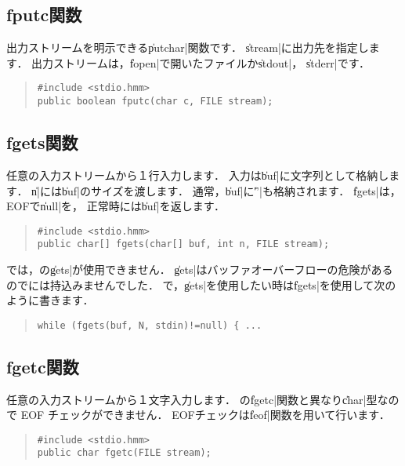\subsection{fputc関数}

出力ストリームを明示できる\|putchar|関数です．
\|stream|に出力先を指定します．
出力ストリームは，\|fopen|で開いたファイルか\|stdout|，
\|stderr|です．

\begin{quote}
\begin{verbatim}
#include <stdio.hmm>
public boolean fputc(char c, FILE stream);
\end{verbatim}
\end{quote}

\subsection{fgets関数}

任意の入力ストリームから１行入力します．
入力は\|buf|に文字列として格納します．
\|n|には\|buf|のサイズを渡します．
通常，\|buf|に\|'\n'|も格納されます．
\|fgets|は，EOFで\|null|を，
正常時には\|buf|を返します．

\begin{quote}
\begin{verbatim}
#include <stdio.hmm>
public char[] fgets(char[] buf, int n, FILE stream);
\end{verbatim}
\end{quote}

\cmm では，\cl の\|gets|が使用できません．
\|gets|はバッファオーバーフローの危険があるので\cmm には持込みませんでした．
\cmm で，\|gets|を使用したい時は\|fgets|を使用して次のように書きます．

\begin{quote}
\begin{verbatim}
while (fgets(buf, N, stdin)!=null) { ...
\end{verbatim}
\end{quote}


\subsection{fgetc関数}

任意の入力ストリームから１文字入力します．
\cl の\|fgetc|関数と異なり\|char|型なので EOF チェックができません．
EOFチェックは\|feof|関数を用いて行います．

\begin{quote}
\begin{verbatim}
#include <stdio.hmm>
public char fgetc(FILE stream);
\end{verbatim}
\end{quote}


